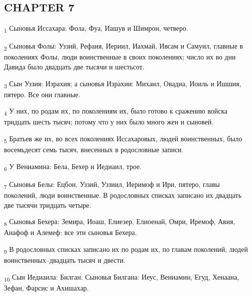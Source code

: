 \subsection{CHAPTER 7}
\begin{tcolorbox}
\textsubscript{1} Сыновья Иссахара: Фола, Фуа, Иашув и Шимрон, четверо.
\end{tcolorbox}
\begin{tcolorbox}
\textsubscript{2} Сыновья Фолы: Уззий, Рефаия, Иериил, Иахмай, Ивсам и Самуил, главные в поколениях Фолы, люди воинственные в своих поколениях; число их во дни Давида было двадцать две тысячи и шестьсот.
\end{tcolorbox}
\begin{tcolorbox}
\textsubscript{3} Сын Уззия: Израхия; а сыновья Израхии: Михаил, Овадиа, Иоиль и Ишшия, пятеро. Все они главные.
\end{tcolorbox}
\begin{tcolorbox}
\textsubscript{4} У них, по родам их, по поколениям их, было готово к сражению войска тридцать шесть тысяч; потому что у них было много жен и сыновей.
\end{tcolorbox}
\begin{tcolorbox}
\textsubscript{5} Братьев же их, во всех поколениях Иссахаровых, людей воинственных, было восемьдесят семь тысяч, внесенных в родословные записи.
\end{tcolorbox}
\begin{tcolorbox}
\textsubscript{6} У Вениамина: Бела, Бехер и Иедиаил, трое.
\end{tcolorbox}
\begin{tcolorbox}
\textsubscript{7} Сыновья Белы: Ецбон, Уззий, Уззиил, Иеримоф и Ири, пятеро, главы поколений, люди воинственные. В родословных списках записано их двадцать две тысячи тридцать четыре.
\end{tcolorbox}
\begin{tcolorbox}
\textsubscript{8} Сыновья Бехера: Земира, Иоаш, Елиезер, Елиоенай, Омри, Иремоф, Авия, Анафоф и Алемеф: все эти сыновья Бехера.
\end{tcolorbox}
\begin{tcolorbox}
\textsubscript{9} В родословных списках записано их по родам их, по главам поколений, людей воинственных--двадцать тысяч и двести.
\end{tcolorbox}
\begin{tcolorbox}
\textsubscript{10} Сын Иедиаила: Билган. Сыновья Билгана: Иеус, Вениамин, Егуд, Хенаана, Зефан, Фарсис и Ахишахар.
\end{tcolorbox}

